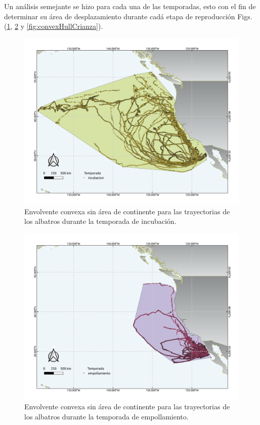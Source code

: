 Un análisis semejante se hizo para cada una de las temporadas, esto con el fin
de determinar su área de desplazamiento durante cadá etapa de reproducción Figs.
(\ref{fig:convexHullIncubacion}, \ref{fig:convexHullEmpollamiento} y
\ref{fig:convexHullCrianza}).

\begin{figure}[h]
    \centering
    \includegraphics[scale=0.60]{figures/convexHullIncubacion.png}
    \caption{Envolvente convexa sin área de continente para las trayectorias
    de los albatros durante la temporada de incubación.}
    \label{fig:convexHullIncubacion}
\end{figure}

\begin{figure}[h]
    \centering
    \includegraphics[scale=0.60]{figures/convexHullEmpollamiento.png}
    \caption{Envolvente convexa sin área de continente para las trayectorias
    de los albatros durante la temporada de empollamiento.}
    \label{fig:convexHullEmpollamiento}
\end{figure}

